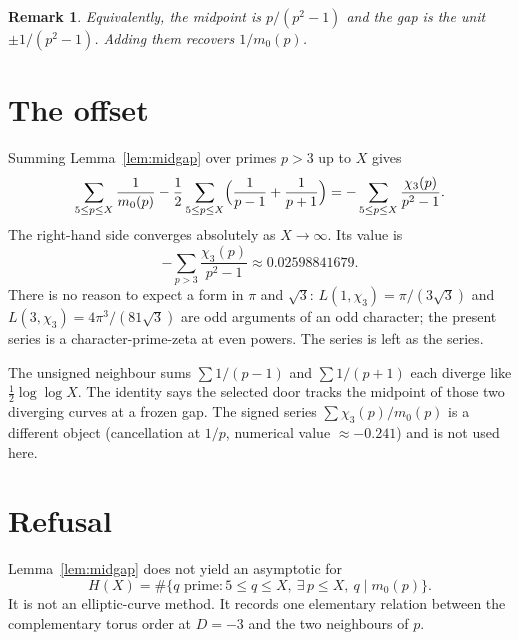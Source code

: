 \documentclass[11pt,a4paper]{article}
\newtheorem{remark}{Remark}
\begin{document}
\begin{remark}
Equivalently, the midpoint is \(p/(p^2-1)\) and the gap is the unit \(\pm 1/(p^2-1)\). Adding them recovers \(1/m_0(p)\).
\end{remark}

\section{The offset}

Summing Lemma~\ref{lem:midgap} over primes \(p>3\) up to \(X\) gives
\[
\sum_{5\le p\le X}\frac1{m_0(p)}-\frac12\sum_{5\le p\le X}\Bigl(\frac1{p-1}+\frac1{p+1}\Bigr)=-\sum_{5\le p\le X}\frac{\chi_3(p)}{p^2-1}.
\]
The right-hand side converges absolutely as \(X\to\infty\). Its value is
\[
-\sum_{p>3}\frac{\chi_3(p)}{p^2-1}\approx 0.02598841679.
\]
There is no reason to expect a form in \(\pi\) and \(\sqrt{3}\): \(L(1,\chi_3)=\pi/(3\sqrt{3})\) and \(L(3,\chi_3)=4\pi^3/(81\sqrt{3})\) are odd arguments of an odd character; the present series is a character-prime-zeta at even powers. The series is left as the series.

The unsigned neighbour sums \(\sum 1/(p-1)\) and \(\sum 1/(p+1)\) each diverge like \(\tfrac12\log\log X\). The identity says the selected door tracks the midpoint of those two diverging curves at a frozen gap. The signed series \(\sum\chi_3(p)/m_0(p)\) is a different object (cancellation at \(1/p\), numerical value \(\approx-0.241\)) and is not used here.

\section{Refusal}

Lemma~\ref{lem:midgap} does not yield an asymptotic for
\[
H(X)=\#\{q\text{ prime}:5\le q\le X,\ \exists\,p\le X,\ q\mid m_0(p)\}.
\]
It is not an elliptic-curve method. It records one elementary relation between the complementary torus order at \(D=-3\) and the two neighbours of \(p\).
\end{document}
